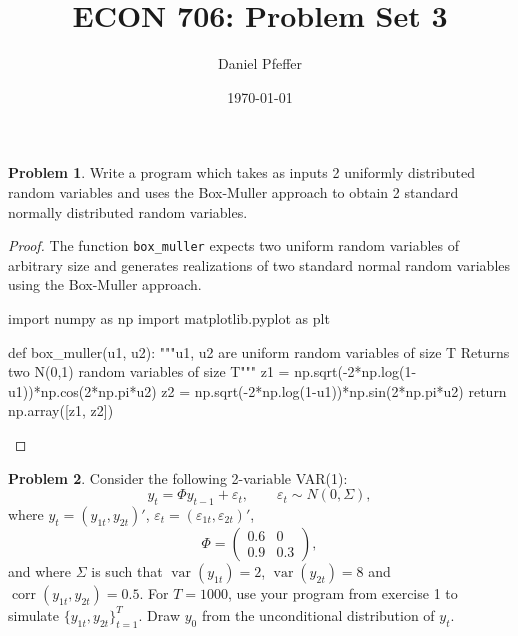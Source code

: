 \documentclass[oneside,reqno]{amsart}
\title{ECON 706: Problem Set 3}
\author{Daniel Pfeffer}
\date{\today}
\DeclareMathOperator{\var}{var}
\DeclareMathOperator{\corr}{corr}
\newcommand{\eps}{\varepsilon}
\theoremstyle{definition}
\newtheorem{prob}{Problem}
\begin{document}
\maketitle

\begin{prob}
Write a program which takes as inputs 2 uniformly distributed random variables and uses the Box-Muller approach to obtain 2 standard normally distributed random variables.
\end{prob}

\begin{proof}
The function \texttt{box_muller} expects two uniform random variables of arbitrary size and generates realizations of two standard normal random variables using the Box-Muller approach.
\begin{python3code}
import numpy as np
import matplotlib.pyplot as plt

def box_muller(u1, u2):
    """u1, u2 are uniform random variables of size T
    Returns two N(0,1) random variables of size T"""
    z1 = np.sqrt(-2*np.log(1-u1))*np.cos(2*np.pi*u2)
    z2 = np.sqrt(-2*np.log(1-u1))*np.sin(2*np.pi*u2)
    return np.array([z1, z2])
\end{python3code}
\end{proof}

\begin{prob}
Consider the following 2-variable VAR(1):
\[
	y_t = \Phi y_{t-1} + \eps_t, 
	\qquad \eps_t \sim N(0, \Sigma),
\]
where $y_t = (y_{1t}, y_{2t})'$, $\eps_t = (\eps_{1t}, \eps_{2t})'$, 
\[
	\Phi = \begin{pmatrix}
		0.6 & 0 \\
		0.9 & 0.3 
	\end{pmatrix},
\]
and where $\Sigma$ is such that $\var(y_{1t}) = 2$, $\var(y_{2t}) = 8$ and  $\corr(y_{1t}, y_{2t}) = 0.5$. For $T=1000$, use your program from exercise 1 to simulate $\{y_{1t}, y_{2t}\}_{t=1}^T$. Draw $y_0$ from the unconditional distribution of $y_t$.
\end{prob}
\end{document}
